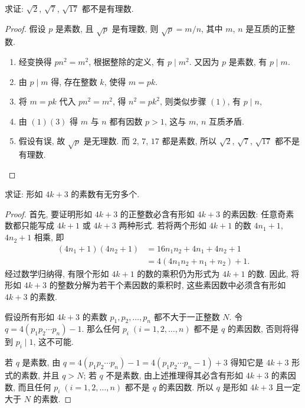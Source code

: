 \documentclass[a4paper,fleqn]{article}
\begin{document}
\begin{exmp}
    求证: $\sqrt{2}$, $\sqrt{7}$, $\sqrt{17}$ 都不是有理数.
    \begin{proof}
        假设 $p$ 是素数, 且 $\sqrt{p}$ 是有理数, 则 $\sqrt{p}=m/n$, 其中 $m$, $n$ 是互质的正整数.
        \begin{enumerate}
            \item 经变换得 $pn^2=m^2$, 根据整除的定义, 有 $p\mid m^2$. 又因为 $p$ 是素数, 有 $p\mid m$.
            \item 由 $p\mid m$ 得, 存在整数 $k$, 使得 $m=pk$.
            \item 将 $m=pk$ 代入 $pn^2=m^2$, 得 $n^2=pk^2$, 则类似步骤 $(1)$, 有 $p\mid n$,
            \item 由 $(1)(3)$ 得 $m$ 与 $n$ 都有因数 $p>1$, 这与 $m$, $n$ 互质矛盾.
            \item 假设有误, 故 $\sqrt{p}$ 是无理数. 而 $2$, $7$, $17$ 都是素数, 所以 $\sqrt{2}$, $\sqrt{7}$, $\sqrt{17}$ 都不是有理数.\qedhere
        \end{enumerate}
    \end{proof}
\end{exmp}

\begin{exmp}
    求证: 形如 $4k+3$ 的素数有无穷多个.
    \begin{proof}
        首先, 要证明形如 $4k+3$ 的正整数必含有形如 $4k+3$ 的素因数: 任意奇素数都只能写成 $4k+1$ 或 $4k+3$ 两种形式. 若将两个形如 $4k+1$ 的数 $4n_1+1$, $4n_2+1$ 相乘, 即
        \begin{align*}
            (4n_1+1)(4n_2+1) & =16n_1n_2+4n_1+4n_2+1  \\
                             & =4(4n_1n_2+n_1+n_2)+1.
        \end{align*}
        经过数学归纳得, 有限个形如 $4k+1$ 的数的乘积仍为形式为 $4k+1$ 的数. 因此, 将形如 $4k+3$ 的整数分解为若干个素因数的乘积时, 这些素因数中必须含有形如 $4k+3$ 的素数.

        假设所有形如 $4k+3$ 的素数 $p_1,p_2,\ldots,p_n$ 都不大于一正整数 $N$. 令 $q=4(p_1p_2\cdots p_n)-1$. 那么任何 $p_i\;(i=1,2,\ldots,n)$ 都不是
        $q$ 的素因数, 否则将得到 $p_i\mid1$, 这不可能.

        若 $q$ 是素数, 由 $q=4(p_1p_2\cdots p_n)-1=4(p_1p_2\cdots p_n-1)+3$ 得知它是 $4k+3$ 形式的素数, 并且 $q>N$; 若 $q$ 不是素数, 由上述推理得其必含有形如 $4k+3$
        的素因数, 而且任何 $p_i\;(i=1,2,\ldots,n)$ 都不是 $q$ 的素因数. 所以 $q$ 是形如 $4k+3$ 且一定大于 $N$ 的素数.
    \end{proof}
\end{exmp}
\end{document}
